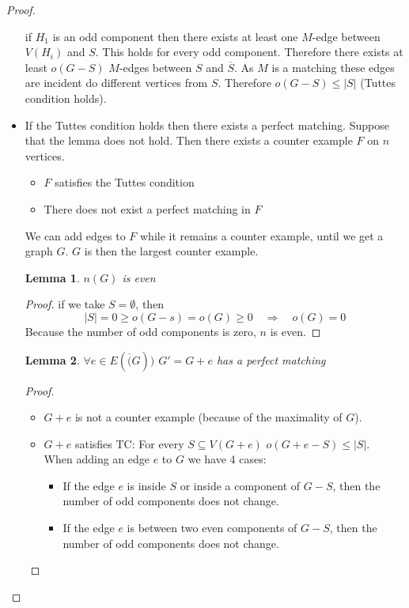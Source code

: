 \documentclass[notitlepage, 12pt]{article}
\newtheorem*{lemma}{Lemma}
\begin{document}
\begin{proof}
\begin{itemize}
    if $H_1$ is an odd component then there exists at least one $M$-edge between $V(H_i)$ and $S$.
    This holds for every odd component. Therefore there exists at least $o(G-S)$ $M$-edges
    between $S$ and $\overline{S}$. As $M$ is a matching these edges are incident do different
    vertices from $S$. Therefore $o(G-S) \leq |S|$ (Tuttes condition holds).
  
    \item[($\Leftarrow$)] If the Tuttes condition holds then there exists a perfect matching.
    Suppose that the lemma does not hold. Then there exists a counter example $F$ on $n$ vertices.
    \begin{itemize}
      \item[(1)] $F$ satisfies the Tuttes condition
      \item[(2)] There does not exist a perfect matching in $F$
    \end{itemize}
    We can add edges to $F$ while it remains a counter example, until we get a graph $G$. $G$ is then
    the largest counter example.
    \begin{lemma}
      $n(G)$ is even
    \end{lemma}
    \begin{proof}
      if we take $S = \emptyset$, then
      \[|S|=0 \geq o(G-s) = o(G) \geq 0 \quad \Rightarrow \quad o(G)=0\]
      Because the number of odd components is zero, $n$ is even.
    \end{proof}
    \begin{lemma}\label{proof-lemma:2}
      $\forall e \in E(\overline(G))$ $G'=G+e$ has a perfect matching
    \end{lemma}
    \begin{proof}
      \begin{itemize}
        \item $G+e$ is not a counter example (because of the maximality of $G$).
        \item $G+e$ satisfies TC:
        For every $S \subseteq V(G+e)$ $o(G+e-S) \leq |S|$.\\
        When adding an edge $e$ to $G$ we have 4 cases:
        \begin{itemize}
          \item[(a)] If the edge $e$ is inside $S$ or inside a component of $G-S$, then the number of
          odd components does not change.
          \item[(b)] If the edge $e$ is between two even components of $G-S$, then the number of odd components
          does not change.

\end{itemize}
\end{itemize}
\end{proof}
\end{itemize}
\end{proof}
\end{document}
